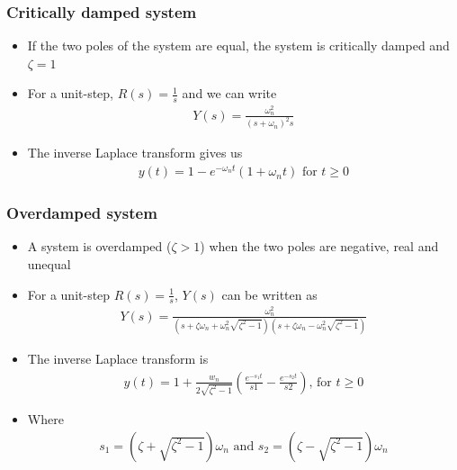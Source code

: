 \begin{frame}
\frametitle{Critically damped system}
\begin{itemize}
\item If the two poles of the system are equal, the system is critically damped and $\zeta=1$
\vspace{0.75cm}
\item For a unit-step, $R(s)=\frac{1}{s}$ and we can write
\begin{align*}
Y(s) =\frac{\omega_n ^2}{(s+\omega_n)^2 s}
\end{align*}
\item The inverse Laplace transform gives us
\begin{align*}
y(t) = 1 - e^{-\omega_n t}(1+\omega_n t) \text{ for } t\ge 0
\end{align*}         
\end{itemize}
\end{frame}

\begin{frame}
\frametitle{Overdamped system}
\begin{itemize}
\item A system is overdamped ($\zeta>1$) when the two poles are negative, real and unequal
\vspace{0.5cm}
\item For a unit-step $R(s)=\frac{1}{s}$, $Y(s)$ can be written as
\\ 
\begin{align*}
Y(s) = \frac{\omega_n ^2}{(s+\zeta\omega_n + \omega_n ^2\sqrt{\zeta^2 -1})(s+\zeta\omega_n - \omega_n ^2\sqrt{\zeta^2 -1})}
\end{align*} 
\item The inverse Laplace transform is
\\ 
\begin{align*}
y(t) = 1 +\frac{w_n}{2\sqrt{\zeta^2-1}}(\frac{e^{-s_1 t}}{s1} - \frac{e^{-s_2 t}}{s2})\text{, for } t\ge 0
\end{align*}
\item Where
\\ 
\begin{align*}
s_1 = (\zeta +\sqrt{\zeta^2 -1})\omega_n\text{ and } s_2 = (\zeta -\sqrt{\zeta^2 -1})\omega_n
\end{align*}
\end{itemize}
\end{frame}

